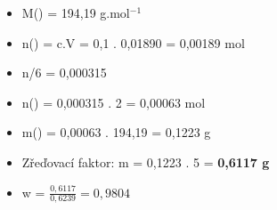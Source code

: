 \begin{itemize}
	\item M() = 194,19 g.mol$^{-1}$
	\item n() = c.V = 0,1 . 0,01890 = 0,00189 mol
	\item n/6 = 0,000315
	\item n() = 0,000315 . 2 = 0,00063 mol
	\item m() = 0,00063 . 194,19 = 0,1223 g
	\item Zřeďovací faktor: m = 0,1223 . 5 = \textbf{0,6117 g} 
	\item w = $\frac{0,6117}{0,6239} = 0,9804$
\end{itemize}

